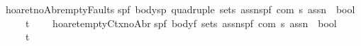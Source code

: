 \begin{isabellebody}
\isanewline
{\isachardoublequoteopen}{\isacharunderscore}hoaret{\isacharunderscore}noAbr{\isacharunderscore}emptyFaults{\isachardoublequoteclose}{\isacharcolon}{\isacharcolon}\isanewline
{\isachardoublequoteopen}{\isacharbrackleft}{\isacharparenleft}{\isacharprime}s{\isacharcomma}{\isacharprime}p{\isacharcomma}{\isacharprime}f{\isacharparenright}\ body{\isacharcomma}{\isacharparenleft}{\isacharprime}s{\isacharcomma}{\isacharprime}p{\isacharparenright}\ quadruple\ set{\isacharcomma}{\isacharprime}s\ assn{\isacharcomma}{\isacharparenleft}{\isacharprime}s{\isacharcomma}{\isacharprime}p{\isacharcomma}{\isacharprime}f{\isacharparenright}\ com{\isacharcomma}\ {\isacharprime}s\ assn{\isacharbrackright}\ {\isacharequal}{\isachargreater}\ bool{\isachardoublequoteclose}\isanewline
\ \ \ \ {\isacharparenleft}{\isachardoublequoteopen}{\isacharparenleft}{}{\isacharunderscore}{\isacharcomma}{\isacharunderscore}{\isacharslash}{\isasymturnstile}\isactrlsub t\ {\isacharparenleft}{\isacharunderscore}{\isacharslash}\ {\isacharparenleft}{\isacharunderscore}{\isacharparenright}{\isacharslash}\ {\isacharunderscore}{\isacharparenright}{\isacharparenright}{\isachardoublequoteclose}\ {\isacharbrackleft}{}{}{\isacharcomma}{}{}{\isacharcomma}{}{}{}{}{\isacharcomma}{}{}{\isacharcomma}{}{}{}{}{\isacharbrackright}{}{}{\isacharparenright}\isanewline
\isanewline
{\isachardoublequoteopen}{\isacharunderscore}hoaret{\isacharunderscore}emptyCtx{\isacharunderscore}noAbr{\isachardoublequoteclose}{\isacharcolon}{\isacharcolon}\isanewline
{\isachardoublequoteopen}{\isacharbrackleft}{\isacharparenleft}{\isacharprime}s{\isacharcomma}{\isacharprime}p{\isacharcomma}{\isacharprime}f{\isacharparenright}\ body{\isacharcomma}{\isacharprime}f\ set{\isacharcomma}{\isacharprime}s\ assn{\isacharcomma}{\isacharparenleft}{\isacharprime}s{\isacharcomma}{\isacharprime}p{\isacharcomma}{\isacharprime}f{\isacharparenright}\ com{\isacharcomma}\ {\isacharprime}s\ assn{\isacharbrackright}\ {\isacharequal}{\isachargreater}\ bool{\isachardoublequoteclose}\isanewline
\ \ \ \ {\isacharparenleft}{\isachardoublequoteopen}{\isacharparenleft}{}{\isacharunderscore}{\isacharslash}{\isasymturnstile}\isactrlsub t\isactrlbsub {\isacharprime}{\isacharslash}{\isacharunderscore}\isactrlesub \ {\isacharparenleft}{\isacharunderscore}{\isacharslash}\ {\isacharparenleft}{\isacharunderscore}{\isacharparenright}{\isacharslash}\ {\isacharunderscore}{\isacharparenright}{\isacharparenright}{\isachardoublequoteclose}\ {\isacharbrackleft}{}{}{\isacharcomma}{}{}{\isacharcomma}{}{}{}{}{\isacharcomma}{}{}{\isacharcomma}{}{}{}{}{\isacharbrackright}{}{}{\isacharparenright}\isanewline

\end{isabellebody}
